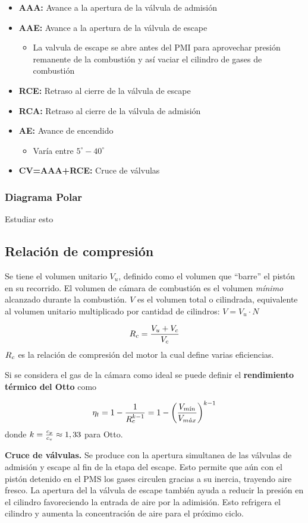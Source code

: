 \begin{itemize}
    \item \textbf{AAA:} Avance a la apertura de la válvula de admisión
    \item \textbf{AAE:} Avance a la apertura de la válvula de escape
    \begin{itemize}
        \item La valvula de escape se abre antes del PMI para aprovechar presión remanente de la combustión y así vaciar el cilindro de gases de combustión
    \end{itemize}
    \item \textbf{RCE:} Retraso al cierre de la válvula de escape
    \item \textbf{RCA:} Retraso al cierre de la válvula de admisión
    \item \textbf{AE:} Avance de encendido
    \begin{itemize}
        \item Varía entre $5^\circ-40^\circ$
    \end{itemize}
    \item \textbf{CV=AAA+RCE:} Cruce de válvulas
\end{itemize}
\subsubsection{Diagrama Polar}
Estudiar esto
\subsection{Relación de compresión}
Se tiene el volumen unitario $V_u$, definido como el volumen que ``barre'' el pistón en su recorrido. El volumen de cámara de combustión es el volumen \textit{mínimo} alcanzado durante la combustión. $V$ es el volumen total o cilindrada, equivalente al volumen unitario multiplicado por cantidad de cilindros: $V=V_u\cdot N$

\[
\rc=\frac{V_u+V_c}{V_c}
\]
$\rc$ es la relación de compresión del motor la cual define varias eficiencias.

Si se considera el gas de la cámara como ideal se puede definir el \textbf{rendimiento térmico del Otto} como

\[
\eta_t=1-\frac{1}{\rc^{\ctegas-1}}=1-\left(\frac{V_\min}{V_\max}\right)^{\ctegas-1}
\]
donde $\ctegas=\frac{c_p}{c_v}\approx1,33$ para Otto.

\textbf{Cruce de válvulas.} Se produce con la apertura simultanea de las válvulas de admisión y escape al fin de la etapa del escape. Esto permite que aún con el pistón detenido en el PMS los gases circulen gracias a su inercia, trayendo aire fresco. La apertura del la válvula de escape también ayuda a reducir la presión en el cilindro favoreciendo la entrada de aire por la adimisión. Esto refrigera el cilindro y aumenta la concentración de aire para el próximo ciclo. 

